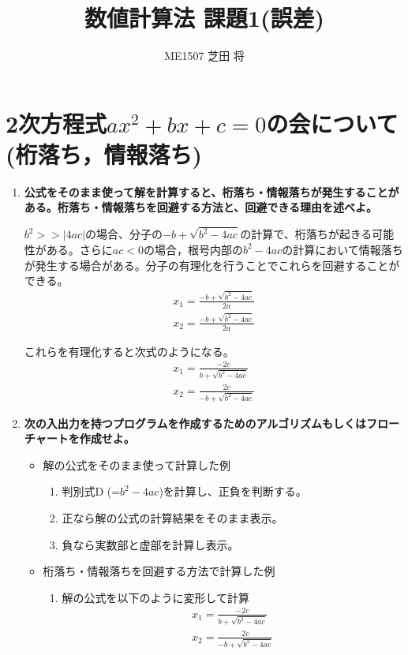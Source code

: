 \documentclass[titlepage]{jsarticle}
\title{\LARGE {数値計算法 課題1(誤差)}}
\author{\large {ME1507 芝田 将}}
\begin{document}
\maketitle

\section{2次方程式$ax^{2}+bx+c=0$の会について(桁落ち，情報落ち)}

\begin{enumerate}
\item \textbf{公式をそのまま使って解を計算すると、桁落ち・情報落ちが発生することがある。桁落ち・情報落ちを回避する方法と、回避できる理由を述べよ。}

$b^{2} >> |4ac|$の場合、分子の$-b + \sqrt{b^{2}-4ac}$の計算で、桁落ちが起きる可能性がある。さらに$ac<0$の場合，根号内部の$b^{2}-4ac$の計算において情報落ちが発生する場合がある。分子の有理化を行うことでこれらを回避することができる。
\begin{eqnarray}
x_{1} = \frac{-b + \sqrt{b^{2}-4ac}}{2a} \\
x_{2} = \frac{-b + \sqrt{b^{2}-4ac}}{2a}
\end{eqnarray}

これらを有理化すると次式のようになる。
\begin{eqnarray}
x_{1} = \frac{-2c}{b+\sqrt{b^{2}-4ac}} \\
x_{2} = \frac{2c}{-b+\sqrt{b^{2}-4ac}}
\end{eqnarray}



\item \textbf{次の入出力を持つプログラムを作成するためのアルゴリズムもしくはフローチャートを作成せよ。}

\begin{itemize}
\item 解の公式をそのまま使って計算した例
\begin{enumerate}
\item 判別式D (=$b^{2}-4ac$)を計算し、正負を判断する。
\item 正なら解の公式の計算結果をそのまま表示。
\item 負なら実数部と虚部を計算し表示。
\end{enumerate}

\item 桁落ち・情報落ちを回避する方法で計算した例
\begin{enumerate}
\item 解の公式を以下のように変形して計算
\begin{eqnarray}
x_{1} = \frac{-2c}{b+\sqrt{b^{2}-4ac}} \\
x_{2} = \frac{2c}{-b+\sqrt{b^{2}-4ac}}
\end{eqnarray}


\end{enumerate}
\end{itemize}
\end{enumerate}
\end{document}
